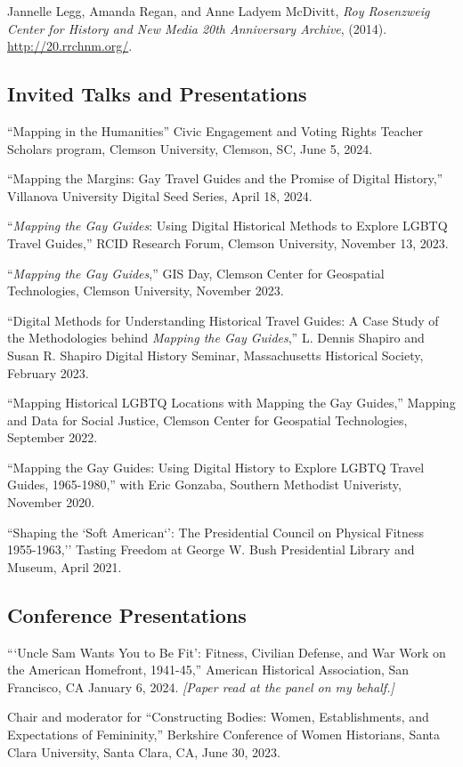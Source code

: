 \documentclass[11pt]{article}
\begin{document}
Jannelle Legg, Amanda Regan, and Anne Ladyem McDivitt, \emph{Roy Rosenzweig Center for History and New Media 20th Anniversary Archive}, (2014). \url{http://20.rrchnm.org/}.

\subsection{Invited Talks and Presentations}
``Mapping in the Humanities'' Civic Engagement and Voting Rights Teacher Scholars program, Clemson University, Clemson, SC, June 5, 2024.

``Mapping the Margins: Gay Travel Guides and the Promise of Digital History,'' Villanova University Digital Seed Series, April 18, 2024.

``\emph{Mapping the Gay Guides}: Using Digital Historical Methods to Explore LGBTQ Travel Guides,'' RCID Research Forum, Clemson University, November 13, 2023.

``\emph{Mapping the Gay Guides},'' GIS Day, Clemson Center for Geospatial Technologies, Clemson University, November 2023. 

``Digital Methods for Understanding Historical Travel Guides: A Case Study of the Methodologies behind \emph{Mapping the Gay Guides},'' L. Dennis Shapiro and Susan R. Shapiro Digital History Seminar, Massachusetts Historical Society, February 2023. 

``Mapping Historical LGBTQ Locations with Mapping the Gay Guides,'' Mapping and Data for Social Justice, Clemson Center for Geospatial Technologies, September 2022.

``Mapping the Gay Guides: Using Digital History to Explore LGBTQ Travel Guides, 1965-1980,'' with Eric Gonzaba, Southern Methodist Univeristy, November 2020.

``Shaping the `Soft American`': The Presidential Council on Physical Fitness 1955-1963,'' Tasting Freedom at George W. Bush Presidential Library and Museum, April 2021.

\subsection{Conference Presentations}
```Uncle Sam Wants You to Be Fit': Fitness, Civilian Defense, and War Work on the American Homefront, 1941-45,'' American Historical Association, San Francisco, CA January 6, 2024. \emph{[Paper read at the panel on my behalf.]}

Chair and moderator for ``Constructing Bodies: Women, Establishments, and Expectations of Femininity,'' Berkshire Conference of Women Historians, Santa Clara University, Santa Clara, CA, June 30, 2023.
\end{document}
